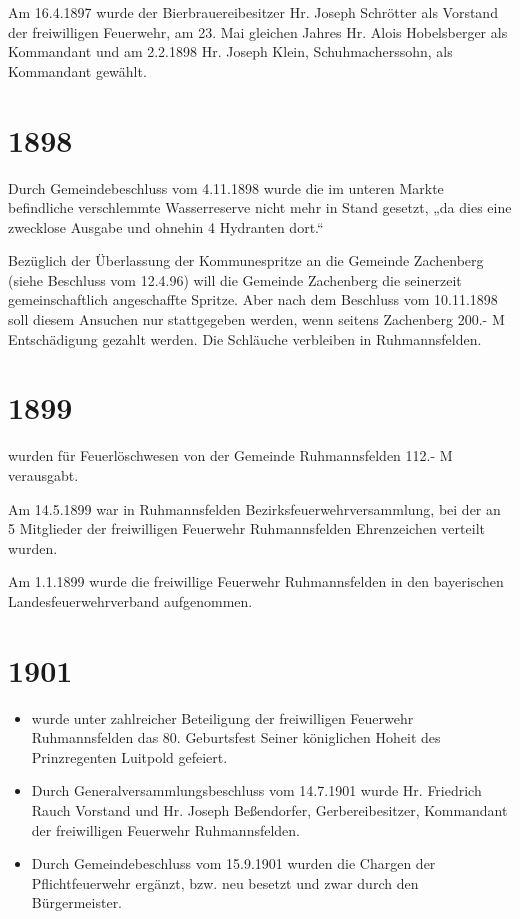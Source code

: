\documentclass[12pt,a4paper]{book}
\begin{document}
Am 16.4.1897 wurde der Bierbrauereibesitzer Hr. Joseph Schrötter als Vorstand
der freiwilligen Feuerwehr, am 23. Mai gleichen Jahres Hr. Alois Hobelsberger
als Kommandant und am 2.2.1898 Hr. Joseph Klein, Schuhmacherssohn, als
Kommandant gewählt.

\section*{1898}

Durch Gemeindebeschluss vom 4.11.1898 wurde die im unteren Markte befindliche
verschlemmte Wasserreserve nicht mehr in Stand gesetzt, „da dies eine zwecklose
Ausgabe und ohnehin 4 Hydranten dort.“

Bezüglich der Überlassung der Kommunespritze an die Gemeinde Zachenberg (siehe
Beschluss vom 12.4.96) will die Gemeinde Zachenberg die seinerzeit
gemeinschaftlich angeschaffte Spritze. Aber nach dem Beschluss vom 10.11.1898
soll diesem Ansuchen nur stattgegeben werden, wenn seitens Zachenberg 200.- M
Entschädigung gezahlt werden. Die Schläuche verbleiben in Ruhmannsfelden.

\section*{1899}

wurden für Feuerlöschwesen von der Gemeinde Ruhmannsfelden 112.- M verausgabt.

Am 14.5.1899 war in Ruhmannsfelden Bezirksfeuerwehrversammlung, bei der an 5
Mitglieder der freiwilligen Feuerwehr Ruhmannsfelden Ehrenzeichen verteilt
wurden.

Am 1.1.1899 wurde die freiwillige Feuerwehr Ruhmannsfelden in den bayerischen
Landesfeuerwehrverband aufgenommen.

\section*{1901}

\begin{itemize}
\item wurde unter zahlreicher Beteiligung der freiwilligen Feuerwehr Ruhmannsfelden
das 80. Geburtsfest Seiner königlichen Hoheit des Prinzregenten Luitpold
gefeiert.

\item Durch Generalversammlungsbeschluss vom 14.7.1901 wurde Hr. Friedrich Rauch
Vorstand und Hr. Joseph Beßendorfer, Gerbereibesitzer, Kommandant der
freiwilligen Feuerwehr Ruhmannsfelden.

\item Durch Gemeindebeschluss vom 15.9.1901 wurden die Chargen der Pflichtfeuerwehr
ergänzt, bzw. neu besetzt und zwar durch den Bürgermeister.
\end{itemize}
\end{document}
